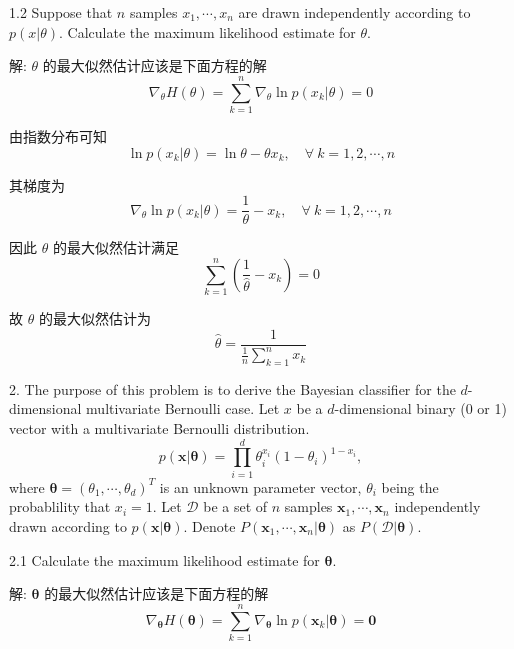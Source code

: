 \documentclass{article}
\begin{document}
1.2 Suppose that $n$ samples ${x_1, \cdots, x_n}$ are drawn independently according to $p(x|\theta)$.
Calculate the maximum likelihood estimate for $\theta$.

解: $\theta$ 的最大似然估计应该是下面方程的解
\begin{equation}
  \nabla_\theta H(\theta)=\sum_{k=1}^n\nabla_\theta\ln p(x_k|\theta)=0
\end{equation}

由指数分布可知
\begin{equation}
  \ln p(x_k|\theta)=\ln\theta-\theta x_k,\quad\forall~k=1,2,\cdots,n
\end{equation}

其梯度为
\begin{equation}
  \nabla_\theta\ln p(x_k|\theta)=\frac{1}{\theta}-x_k,\quad\forall~k=1,2,\cdots,n
\end{equation}

因此 $\theta$ 的最大似然估计满足
\begin{equation}
  \sum_{k=1}^n\left(\frac{1}{\hat{\theta}}-x_k\right)=0
\end{equation}

故 $\theta$ 的最大似然估计为
\begin{equation}
  \hat{\theta}=\frac{1}{\displaystyle\frac{1}{n}\sum_{k=1}^nx_k}
\end{equation}

2. The purpose of this problem is to derive the Bayesian classifier for the $d$-dimensional multivariate Bernoulli case. Let $x$ be a $d$-dimensional binary (0 or 1) vector with a multivariate Bernoulli distribution.
\begin{equation}
  p(\bm{x}|\bm{\theta})
  =\prod_{i=1}^{d} \theta_{i}^{x_{i}}\left(1-\theta_{i}\right)^{1-x_{i}},
\end{equation}
where $\bm{\theta}=\left(\theta_{1}, \cdots, \theta_{d}\right)^{T}$ is an unknown parameter vector, $\theta_i$ being the probablility that $x_i=1$. Let $\mathcal{D}$ be a set of $n$ samples $\bm{x}_1, \cdots, \bm{x}_n$ independently drawn according to $p(\bm{x}|\bm{\theta})$. Denote $P\left(\bm{x}_{1}, \cdots, \bm{x}_{n}|\bm{\theta}\right)$ as $P(\mathcal{D}|\bm{\theta})$.

2.1 Calculate the maximum likelihood estimate for $\bm{\theta}$.

解: $\bm{\theta}$ 的最大似然估计应该是下面方程的解
\begin{equation}
  \nabla_{\bm{\theta}} H(\bm{\theta})=\sum_{k=1}^n\nabla_{\bm{\theta}}\ln p(\bm{x}_k|\bm{\theta})=\bm{0}
\end{equation}
\end{document}
